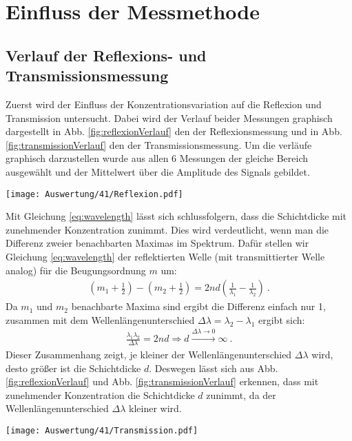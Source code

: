 
\section{Einfluss der Messmethode }
\label{sec:mess}

\subsection{Verlauf der Reflexions- und Transmissionsmessung}
\label{sub:verlauf}

Zuerst wird der Einfluss der Konzentrationsvariation auf die Reflexion und Transmission untersucht. 
Dabei wird der Verlauf beider Messungen graphisch dargestellt in Abb. \ref{fig:reflexionVerlauf} den der Reflexionsmessung und in Abb. \ref{fig:transmissionVerlauf} den der Transmissionsmessung. Um die verläufe graphisch darzustellen wurde aus allen 6 Messungen der gleiche Bereich ausgewählt und der Mittelwert über die Amplitude des Signals gebildet.
\begin{center}
	\captionsetup{type=figure}
	\texttt{[image: Auswertung/41/Reflexion.pdf]}
	\label{fig:reflexionVerlauf}
\end{center}
Mit Gleichung \ref{eq:wavelength} lässt sich schlussfolgern, dass die Schichtdicke mit zunehmender Konzentration zunimmt. Dies wird verdeutlicht, wenn man die Differenz zweier benachbarten Maximas im Spektrum. Dafür stellen wir Gleichung \ref{eq:wavelength} der reflektierten Welle (mit transmittierter Welle analog) für die Beugungsordnung $m$ um:
\begin{gather}
	\left(m_1 + \frac{1}{2}\right) - \left(m_2 + \frac{1}{2}\right) = 2nd \left(\frac{1}{\lambda_1} - \frac{1}{\lambda_2}\right)~.
\end{gather}
Da $m_1$ und $m_2$ benachbarte Maxima sind ergibt die Differenz einfach nur 1, zusammen mit dem Wellenlängenunterschied $\Delta \lambda = \lambda_2 - \lambda_1$ ergibt sich:
\begin{gather}
	\boxed{\frac{\lambda_1\lambda_2}{\Delta\lambda} = 2nd \Rightarrow d \xrightarrow{\Delta \lambda \rightarrow 0} \infty}~.
\end{gather} 
Dieser Zusammenhang zeigt, je kleiner der Wellenlängenunterschied $\Delta \lambda$ wird, desto größer ist die Schichtdicke $d$. Deswegen lässt sich aus Abb. \ref{fig:reflexionVerlauf} und Abb. \ref{fig:transmissionVerlauf} erkennen, dass mit zunehmender Konzentration die Schichtdicke $d$ zunimmt, da der Wellenlängenunterschied $\Delta \lambda$ kleiner wird.
\begin{center}
	\captionsetup{type=figure}
	\texttt{[image: Auswertung/41/Transmission.pdf]}
	\label{fig:transmissionVerlauf}
\end{center}

